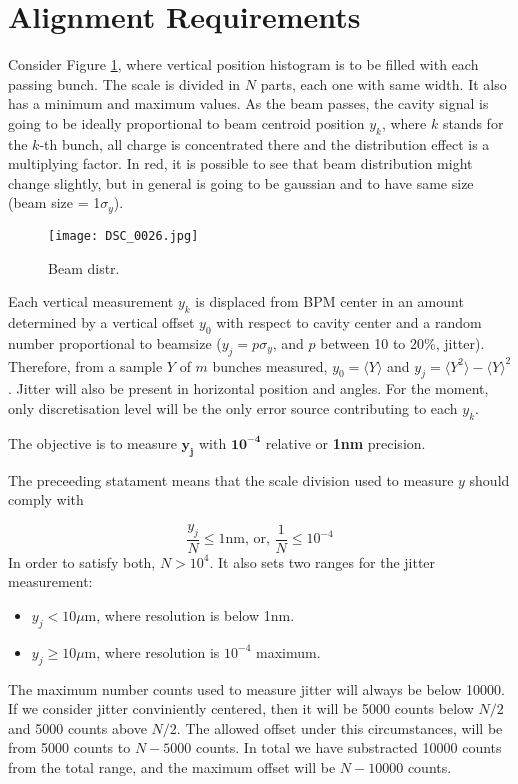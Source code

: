 \section{Alignment Requirements}
Consider Figure \ref{beamdist}, where vertical position histogram is to be filled with each passing bunch. The scale is divided in $N$ parts, each one with same width. It also has a minimum and maximum values. As the beam passes, the cavity signal is going to be ideally proportional to beam centroid position $y_k$, where $k$ stands for the $k$-th bunch, all charge is concentrated there and the distribution effect is a multiplying factor. In red, it is possible to see that beam distribution might change slightly, but in general is going to be gaussian and to have same size (beam size = 1$\sigma_y$).
\begin{figure}[htb]
\begin{center}
 \texttt{[image: DSC\_0026.jpg]}\caption{Beam distr.}\label{beamdist}
 \end{center}
\end{figure}
Each vertical measurement $y_k$ is displaced from BPM center in an amount determined by a vertical offset $y_0$ with respect to cavity center and a random number proportional to beamsize ($y_j=p\sigma_y$, and $p$ between 10 to 20\%, jitter). Therefore, from a sample $Y$ of $m$ bunches measured, $y_0=\langle Y\rangle$ and $y_j=\langle Y^2\rangle-\langle Y\rangle^2$. Jitter will also be present in horizontal position and angles. For the moment, only discretisation level will be the only error source contributing to each $y_k$.\par
The objective is to measure $\boldsymbol{y_j}$ with $\boldsymbol{10^{-4}}$ relative or \textbf{1nm} precision.\par
The preceeding statament means that the scale division used to measure $y$ should comply with\par
\begin{equation}
  \frac{y_j}{N}\leq1\text{nm, or, }\frac{1}{N}\leq10^{-4}
\end{equation}
In order to satisfy both, $N>10^{4}$. It also sets two ranges for the jitter measurement:
\begin{itemize}
 \item $y_j<10\mu$m, where resolution is below 1nm.
 \item $y_j\geq10\mu$m, where resolution is $10^{-4}$ maximum.
\end{itemize}
The maximum number counts used to measure jitter will always be below 10000. If we consider jitter conviniently centered, then it will be 5000 counts below $N/2$ and 5000 counts above $N/2$. The allowed offset under this circumstances, will be from 5000 counts to $N-5000$ counts. In total we have substracted 10000 counts from the total range, and the maximum offset will be $N-10000$ counts.\par
